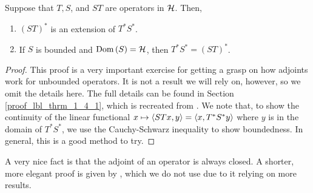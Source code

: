 \begin{theorem}\label{lbl_thrm_1_4_1}
  Suppose that $T, S$, and $ST$ are operators in $\mathcal{H}$. Then,
  \begin{enumerate}[label = (\alph*)]
    \item $(ST)^*$ is an extension of $T^* S^*$.
    \item If $S$ is bounded and $\operatorname{Dom}\left(S\right) = \mathcal{H}$, then $T^*S^* = (ST)^*$.
  \end{enumerate}
\end{theorem}
\begin{proof}
  This proof is a very important exercise for getting a grasp on how adjoints work for unbounded operators. It is not a result we will rely on, however, so we omit the details here. The full details can be found in Section \eqref{proof_lbl_thrm_1_4_1}, which is recreated from {\cite[Theorem 13.2]{rudin}}. We note that, to show the continuity of the linear functional $x \mapsto \left\langle STx, y\right\rangle = \left\langle x, T^*S^*y\right\rangle$ where $y$ is in the domain of $T^*S^*$, we use the Cauchy-Schwarz inequality to show boundedness. In general, this is a good method to try.
\end{proof}

A very nice fact is that the adjoint of an operator is always closed. A shorter, more elegant proof is given by {\cite[Theorem 13.9]{rudin}}, which we do not use due to it relying on more results.

